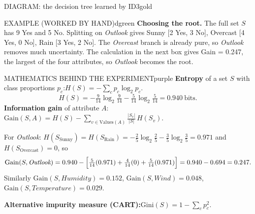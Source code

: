 \documentclass[11pt,a4paper]{article}
\newenvironment{example}{\begin{secbox}{EXAMPLE (WORKED BY HAND)}{dgreen}}{\end{secbox}}
\newenvironment{maths}{\begin{secbox}{MATHEMATICS BEHIND THE EXPERIMENT}{purple}}{\end{secbox}}
\newenvironment{diagram}[1]{\begin{secbox}{DIAGRAM: #1}{gold}\centering}{\end{secbox}}
\begin{document}
\begin{diagram}{the decision tree learned by ID3}
\end{diagram}

\begin{example}
\textbf{Choosing the root.} The full set $S$ has 9 Yes and 5 No. Splitting on \textit{Outlook} gives Sunny [2 Yes, 3 No], Overcast [4 Yes, 0 No], Rain [3 Yes, 2 No]. The \textit{Overcast} branch is already pure, so \textit{Outlook} removes much uncertainty. The calculation in the next box gives Gain = 0.247, the largest of the four attributes, so \textit{Outlook} becomes the root.
\end{example}

\begin{maths}
\textbf{Entropy} of a set $S$ with class proportions $p_c$:\qquad $H(S)=-\sum_{c}p_c\log_2 p_c$.
\[ H(S)=-\tfrac{9}{14}\log_2\tfrac{9}{14}-\tfrac{5}{14}\log_2\tfrac{5}{14}=0.940\ \text{bits}. \]
\textbf{Information gain} of attribute $A$:\qquad $\displaystyle \mathrm{Gain}(S,A)=H(S)-\sum_{v\in \mathrm{Values}(A)}\frac{|S_v|}{|S|}\,H(S_v)$.

For \textit{Outlook}: $H(S_{\text{Sunny}})=H(S_{\text{Rain}})=-\tfrac25\log_2\tfrac25-\tfrac35\log_2\tfrac35=0.971$ and $H(S_{\text{Overcast}})=0$, so
\[ \mathrm{Gain}(S,\textit{Outlook})=0.940-\Bigl[\tfrac{5}{14}(0.971)+\tfrac{4}{14}(0)+\tfrac{5}{14}(0.971)\Bigr]=0.940-0.694=0.247 . \]
Similarly $\mathrm{Gain}(S,\textit{Humidity})=0.152$, $\mathrm{Gain}(S,\textit{Wind})=0.048$, $\mathrm{Gain}(S,\textit{Temperature})=0.029$.

\textbf{Alternative impurity measure (CART):}\quad $\mathrm{Gini}(S)=1-\sum_c p_c^{2}$.
\end{maths}
\end{document}
